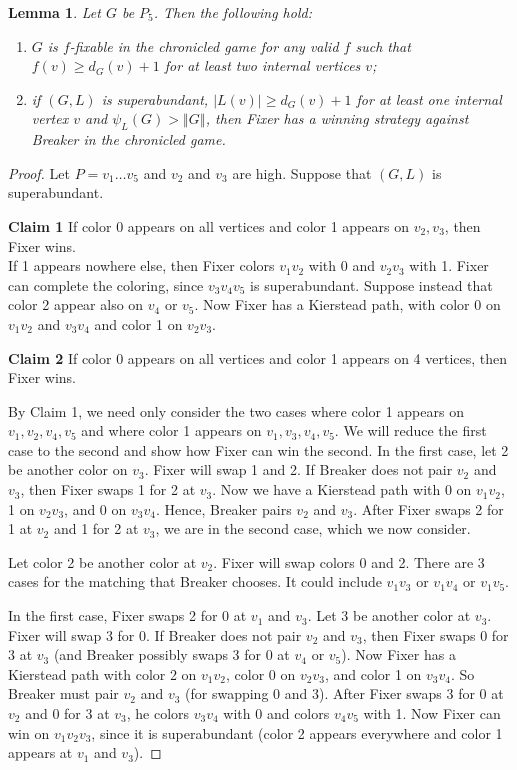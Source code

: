 \documentclass[12pt,reqno]{amsart}
\theoremstyle{plain}
\newtheorem{lem}[thm]{Lemma}
\theoremstyle{definition}
\theoremstyle{remark}
\newcommand{\card}[1]{\left|#1\right|}
\newcommand{\size}[1]{\left\Vert#1\right\Vert}
\begin{document}
\begin{lem}\label{FixP5}
Let $G$ be $P_5$.  Then the following hold:

\begin{enumerate}
\item $G$ is $f$-fixable in the chronicled game for any valid $f$ such that $f(v) \ge d_G(v) + 1$ for at least two internal vertices $v$;
\item if $(G, L)$ is superabundant, $\card{L(v)} \ge d_G(v) + 1$ for at least one internal vertex $v$ and $\psi_L(G) > \size{G}$, then Fixer has a winning strategy against Breaker in the chronicled game.
\end{enumerate}
\end{lem}
\begin{proof}
Let $P=v_1\ldots v_5$ and $v_2$ and $v_3$ are high.
Suppose that $(G,L)$ is superabundant.

\noindent
\textbf{Claim 1} If color 0 appears on all vertices and color 1 appears on
$v_2,v_3$, then Fixer wins.\\
If 1 appears nowhere else, then Fixer colors $v_1v_2$ with 0 and $v_2v_3$ with
1.  Fixer can complete the coloring, since $v_3v_4v_5$ is superabundant.
Suppose instead that color 2 appear also on $v_4$ or $v_5$.  Now Fixer has a
Kierstead path, with color 0 on $v_1v_2$ and $v_3v_4$ and color 1 on $v_2v_3$.
\smallskip

\noindent
\textbf{Claim 2} If color 0 appears on all vertices and color 1 appears on
4 vertices, then Fixer wins.

By Claim 1, we need only consider the two cases where color 1 appears on
$v_1,v_2,v_4,v_5$ and where color 1 appears on $v_1,v_3,v_4,v_5$.
We will reduce the first case to the second and show how Fixer can win the
second.  In the first case, let 2 be another color on $v_3$.  Fixer will swap 1
and 2.  If Breaker does not pair $v_2$ and $v_3$, then Fixer swaps 1 for 2 at
$v_3$.  Now we have a Kierstead path with 0 on $v_1v_2$, 1 on $v_2v_3$, and 0
on $v_3v_4$.  Hence, Breaker pairs $v_2$ and $v_3$.  After Fixer swaps 2 for 1
at $v_2$ and 1 for 2 at $v_3$, we are in the second case, which we now consider.

Let color 2 be another color at $v_2$.  Fixer will swap colors 0 and 2. 
There are 3 cases for the matching that Breaker chooses.  It could include
$v_1v_3$ or $v_1v_4$ or $v_1v_5$.

In the first case, Fixer swaps 2 for 0 at $v_1$ and $v_3$.  Let 3 be another
color at $v_3$.  Fixer will swap 3 for 0.  If Breaker does not pair $v_2$ and
$v_3$, then Fixer swaps 0 for 3 at $v_3$ (and Breaker possibly swaps 3 for 0 at
$v_4$ or $v_5$).  Now Fixer has a Kierstead path with color 2 on $v_1v_2$,
color 0 on $v_2v_3$, and color 1 on $v_3v_4$.  So Breaker must pair $v_2$ and
$v_3$ (for swapping 0 and 3).  After Fixer swaps 3 for 0 at $v_2$ and 0 for 3
at $v_3$, he colors $v_3v_4$ with 0 and colors $v_4v_5$ with 1.  Now Fixer can
win on $v_1v_2v_3$, since it is superabundant (color 2 appears everywhere and
color 1 appears at $v_1$ and $v_3$).


\end{proof}
\end{document}
